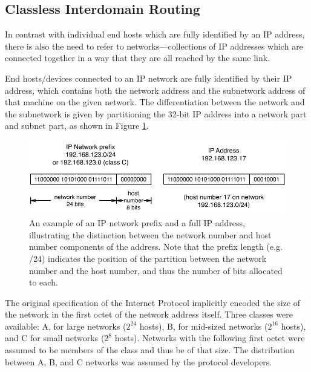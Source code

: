 \subsection{Classless Interdomain Routing}

In contrast with individual end hosts which are fully identified by an IP address, there is also the need to refer to networks---collections of IP addresses which are connected together in a way that they are all reached by the same link.


End hosts/devices connected to an IP network are fully identified by their IP address, which contains both the network address and the subnetwork address of that machine on the given network. The differentiation between the network and the subnetwork is given by partitioning the 32-bit IP address into a network part and subnet part, as shown in Figure \ref{fig:ip_prefix_address}.

\begin{figure}[h]
\begin{centering}
\includegraphics[width=6in]{static_figures/prefix_address.pdf}
\caption[An example of an IP network prefix and a full IP address]{An example of an IP network prefix and a full IP address, illustrating the distinction between the network number and host number components of the address. Note that the prefix length (e.g. /24) indicates the position of the partition between the network number and the host number, and thus the number of bits allocated to each.}
\label{fig:ip_prefix_address}
\end{centering}
\end{figure}

The original specification of the Internet Protocol implicitly encoded the size of the network in the first octet of the network address itself. Three classes were available: A, for large networks ($2^{24}$ hosts), B, for mid-sized networks ($2^{16}$ hosts), and C for small networks ($2^{8}$ hosts). Networks with the following first octet were assumed to be members of the class and thus be of that size. The distribution between A, B, and C networks was assumed by the protocol developers.

